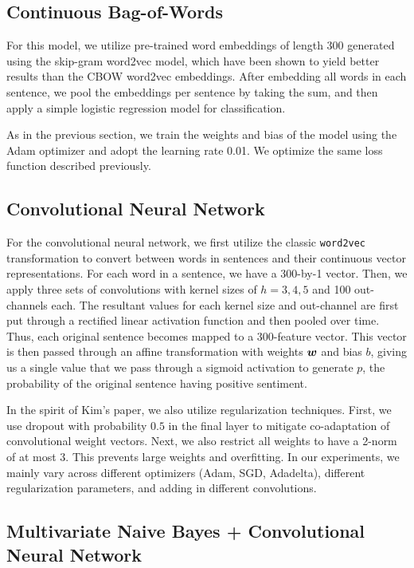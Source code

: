 \documentclass[11pt]{article}
\begin{document}
\subsection{Continuous Bag-of-Words}
For this model, we utilize pre-trained word embeddings of length 300 generated using the skip-gram word2vec model, which have been shown to yield better results than the CBOW word2vec embeddings. After embedding all words in each sentence, we pool the embeddings per sentence by taking the sum, and then apply a simple logistic regression model for classification. 

As in the previous section, we train the weights and bias of the model using the Adam optimizer and adopt the learning rate 0.01. We optimize the same loss function described previously.

\subsection{Convolutional Neural Network}
For the convolutional neural network, we first utilize the classic \texttt{word2vec} transformation to convert between words in sentences and their continuous vector representations.  For each word in a sentence, we have a 300-by-1 vector.  Then, we apply three sets of convolutions with kernel sizes of $h = 3, 4, 5$ and 100 out-channels each.  The resultant values for each kernel size and out-channel are first put through a rectified linear activation function and then pooled over time.  Thus, each original sentence becomes mapped to a 300-feature vector.  This vector is then passed through an affine transformation with weights $\boldsymbol{w}$ and bias $b$, giving us a single value that we pass through a sigmoid activation to generate $p$, the probability of the original sentence having positive sentiment.  

In the spirit of Kim's paper, we also utilize regularization techniques.  First, we use dropout with probability $0.5$ in the final layer to mitigate co-adaptation of convolutional weight vectors.  Next, we also restrict all weights to have a 2-norm of at most 3.  This prevents large weights and overfitting.  In our experiments, we mainly vary across different optimizers (Adam, SGD, Adadelta), different regularization parameters, and adding in different convolutions.  

\subsection{Multivariate Naive Bayes + Convolutional Neural Network}
\end{document}

